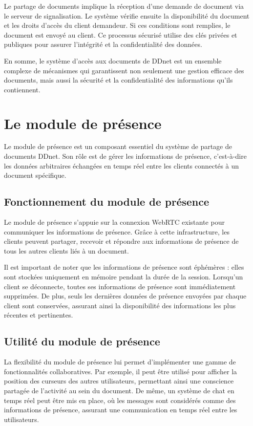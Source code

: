 Le partage de documents implique la réception d'une demande de document via le serveur de signalisation. Le système vérifie ensuite la disponibilité du document et les droits d'accès du client demandeur. Si ces conditions sont remplies, le document est envoyé au client. Ce processus sécurisé utilise des clés privées et publiques pour assurer l'intégrité et la confidentialité des données.

En somme, le système d'accès aux documents de \Gls{DDnet} est un ensemble complexe de mécanismes qui garantissent non seulement une gestion efficace des documents, mais aussi la sécurité et la confidentialité des informations qu'ils contiennent.

\section{Le module de présence}
Le module de présence est un composant essentiel du système de partage de documents \Gls{DDnet}. Son rôle est de gérer les informations de présence, c'est-à-dire les données arbitraires échangées en temps réel entre les clients connectés à un document spécifique.

\subsection{Fonctionnement du module de présence}
Le module de présence s'appuie sur la connexion \Gls{WebRTC} existante pour communiquer les informations de présence. Grâce à cette infrastructure, les clients peuvent partager, recevoir et répondre aux informations de présence de tous les autres clients liés à un document.

Il est important de noter que les informations de présence sont éphémères : elles sont stockées uniquement en mémoire pendant la durée de la session. Lorsqu'un client se déconnecte, toutes ses informations de présence sont immédiatement supprimées. De plus, seuls les dernières données de présence envoyées par chaque client sont conservées, assurant ainsi la disponibilité des informations les plus récentes et pertinentes.

\subsection{Utilité du module de présence}
La flexibilité du module de présence lui permet d'implémenter une gamme de fonctionnalités collaboratives. Par exemple, il peut être utilisé pour afficher la position des curseurs des autres utilisateurs, permettant ainsi une conscience partagée de l'activité au sein du document. De même, un système de chat en temps réel peut être mis en place, où les messages sont considérés comme des informations de présence, assurant une communication en temps réel entre les utilisateurs.